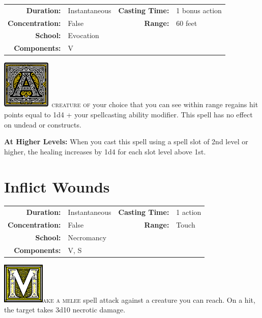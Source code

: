 \documentclass[12pt,showtrims]{memoir}
\begin{document}
{
\small\centering\vspace{-6pt}
\begin{tabular}{rlrl}
\toprule

\textbf{Duration:} & Instantaneous &
\textbf{Casting Time:} & 1 bonus action \\
\textbf{Concentration:} & False &
\textbf{Range:} & 60 feet \\
\textbf{School:} & Evocation \\
\textbf{Components:} & \multicolumn{3}{p{0.7\textwidth}}{V}\\

\bottomrule
\end{tabular}
}

\vspace{1\baselineskip}\noindent
\lettrine[lines=4]{\includegraphics[height=66pt]{initials/A.png}}{\ creature of} your choice that you can see within range regains hit points equal to 1d4 + your spellcasting ability modifier. This spell has no effect on undead or constructs.

\vspace{8pt} \noindent\textbf{At Higher Levels:} When you cast this spell using a spell slot of 2nd level or higher, the healing increases by 1d4 for each slot level above 1st.

\newpage
\section*{Inflict Wounds}

{
\small\centering\vspace{-6pt}
\begin{tabular}{rlrl}
\toprule

\textbf{Duration:} & Instantaneous &
\textbf{Casting Time:} & 1 action \\
\textbf{Concentration:} & False &
\textbf{Range:} & Touch \\
\textbf{School:} & Necromancy \\
\textbf{Components:} & \multicolumn{3}{p{0.7\textwidth}}{V, S}\\

\bottomrule
\end{tabular}
}

\vspace{1\baselineskip}\noindent
\lettrine[lines=4]{\includegraphics[height=56pt]{initials/M.png}}{ake a melee} spell attack against a creature you can reach. On a hit, the target takes 3d10 necrotic damage.
\end{document}
